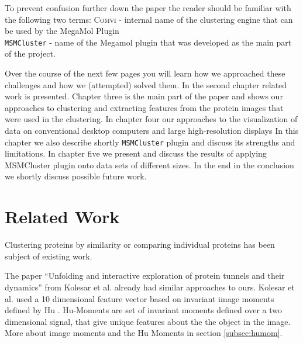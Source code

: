 \documentclass[journal]{vgtc}       %
\begin{document}



To prevent confusion further down the paper  the reader should be familiar with the following two terms: \textsc{Comvi} - internal name of the clustering engine that can be used by the MegaMol Plugin \\
\verb|MSMCluster| - name of the Megamol plugin that was developed as the main part of the project.

Over the course of the next few pages you will learn how we approached these challenges and how we (attempted) solved them. In the second chapter related work is presented. Chapter three is the main part of the paper and shows our approaches to clustering and extracting features from the protein images that were used in the clustering. In chapter four our approaches to the visualization of data on conventional desktop computers and large high-resolution displays In this chapter we also describe shortly \verb|MSMCluster| plugin and discuss its strengths and limitations. In chapter five we present and discuss the results of applying MSMCluster plugin onto data sets of different sizes. In the end in the conclusion we shortly discuss possible future work.


\section{Related Work}\label{sec:relatedWork}

Clustering proteins by similarity or comparing individual proteins has been subject of existing work.

The paper ``Unfolding and interactive exploration of protein tunnels and their dynamics'' \cite{kolesar} from Kolesar et al.  already had similar approaches to ours. Kolesar et al. used a 10 dimensional feature vector based on invariant image moments defined by Hu \cite{humoments}. Hu-Moments are set of invariant moments defined over a two dimensional signal, that give unique features about the the object in the image. More about image moments and the Hu Moments in section \ref{subsec:humom}.
\end{document}
